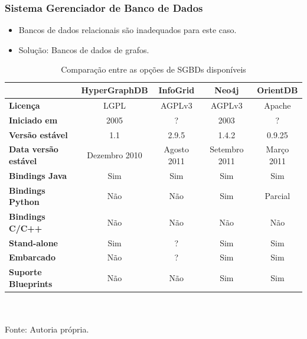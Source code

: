 \frame
{
\frametitle{Sistema Gerenciador de Banco de Dados}
\begin{itemize}
	\item Bancos de dados relacionais são inadequados para este caso.
	\item Solução: Bancos de dados de grafos.
\end{itemize}
\begin{table}[!htb]
	\centering
	\setlength{\tabcolsep}{2pt}
	\scriptsize
	\caption{Comparação entre as opções de SGBDs disponíveis}
	\newcolumntype{C}{c}
	\begin{tabular}{lccCc}
		\hline
		& \textbf{HyperGraphDB} & \textbf{InfoGrid} & \textbf{Neo4j} & \textbf{OrientDB} \\
		\hline
		\textbf{Licença} & LGPL & AGPLv3 & AGPLv3 & Apache \\
		\textbf{Iniciado em} & 2005 & ? & 2003 & ? \\
		\textbf{Versão estável} & 1.1 & 2.9.5 & 1.4.2 & 0.9.25 \\
		\textbf{Data versão estável} & Dezembro 2010 & Agosto 2011 & Setembro 2011 & Março 2011 \\
		\textbf{Bindings Java} & Sim & Sim & Sim & Sim \\
		\textbf{Bindings Python} & Não & Não & Sim & Parcial \\
		\textbf{Bindings C/C++} & Não & Não & Não & Não \\
		\textbf{Stand-alone} & Sim & ? & Sim & Sim \\
		\textbf{Embarcado} & Não & ? & Sim & Sim \\
		\textbf{Suporte Blueprints} & Não & Não & Sim & Sim \\
		\hline
	\end{tabular}
	\\ ~ \\
	\tiny
	Fonte: Autoria própria.
\end{table}
}

